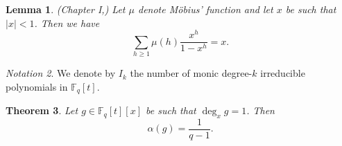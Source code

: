 \documentclass[a4wide]{article}
\newcommand{\F}{{\mathbb F}}
\theoremstyle{plain}
\newtheorem{theo}{Theorem}[section]
\newtheorem{lem}[theo]{Lemma}
\theoremstyle{definition}
\theoremstyle{remark}
\newtheorem{nott}[theo]{Notation}
\begin{document}
\begin{lem} (Chapter I,\cite{Ap90}) \label{Möbius}
	Let $\mu$ denote Möbius' function and let $x$ be such that $|x|<1$.
        Then we have
	\begin{equation*}
	\sum_{h\geq
	1}\mu(h)\frac{x^h}{1-x^h}=x.
\end{equation*}
\end{lem}

\begin{nott}
	We denote by $I_k$ the number of monic degree-$k$ irreducible
        polynomials in $\F_q[t]$.
\end{nott}
\begin{theo}\label{alpha_x}
	Let $g\in\F_q[t][x]$ be such that $\deg_xg=1$. Then 
	\begin{equation*}
		\alpha(g)=\frac{1}{q-1}.		
	\end{equation*}
\end{theo}
\end{document}
